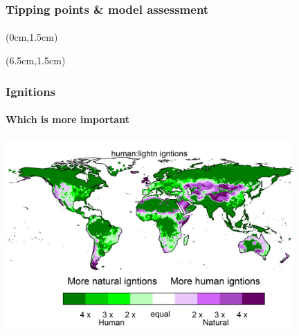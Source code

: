 \addtocounter{framenumber}{-1}
\begin{frame}
	\frametitle{Tipping points \& model assessment}
	\framesubtitle{}
	
	\begin{textblock*}{12cm}(0cm,1.5cm)
	\end{textblock*}
	\begin{textblock*}{12cm}(6.5cm,1.5cm)
	\end{textblock*}
\end{frame}

\addtocounter{framenumber}{-1}
\begin{frame}
	\frametitle{Ignitions}
	\framesubtitle{Which is more important}
	
	\includegraphics[width=11.0cm]{images/igntitions/IgntionInfosourceImportance}
\end{frame}


